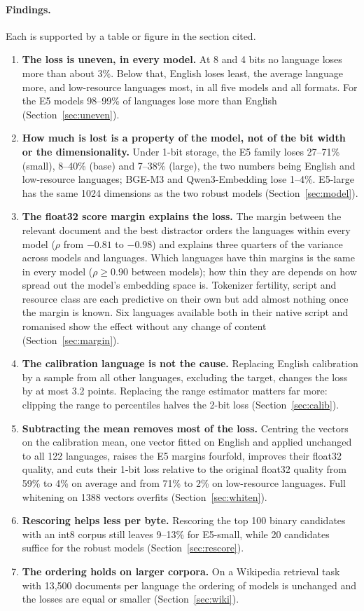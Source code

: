 \documentclass[10pt]{article}
\begin{document}
\paragraph{Findings.} Each is supported by a table or figure in the section cited.
\begin{enumerate}[nosep]
\item \textbf{The loss is uneven, in every model.} At 8 and 4 bits no language loses more than about 3\%. Below that, English loses least, the average language more, and low-resource languages most, in all five models and all formats. For the E5 models 98--99\% of languages lose more than English (Section~\ref{sec:uneven}).
\item \textbf{How much is lost is a property of the model, not of the bit width or the dimensionality.} Under 1-bit storage, the E5 family loses 27--71\% (small), 8--40\% (base) and 7--38\% (large), the two numbers being English and low-resource languages; BGE-M3 and Qwen3-Embedding lose 1--4\%. E5-large has the same 1024 dimensions as the two robust models (Section~\ref{sec:model}).
\item \textbf{The float32 score margin explains the loss.} The margin between the relevant document and the best distractor orders the languages within every model ($\rho$ from $-0.81$ to $-0.98$) and explains three quarters of the variance across models and languages. Which languages have thin margins is the same in every model ($\rho\ge0.90$ between models); how thin they are depends on how spread out the model's embedding space is. Tokenizer fertility, script and resource class are each predictive on their own but add almost nothing once the margin is known. Six languages available both in their native script and romanised show the effect without any change of content (Section~\ref{sec:margin}).
\item \textbf{The calibration language is not the cause.} Replacing English calibration by a sample from all other languages, excluding the target, changes the loss by at most 3.2 points. Replacing the range estimator matters far more: clipping the range to percentiles halves the 2-bit loss (Section~\ref{sec:calib}).
\item \textbf{Subtracting the mean removes most of the loss.} Centring the vectors on the calibration mean, one vector fitted on English and applied unchanged to all 122 languages, raises the E5 margins fourfold, improves their float32 quality, and cuts their 1-bit loss relative to the original float32 quality from 59\% to 4\% on average and from 71\% to 2\% on low-resource languages. Full whitening on 1388 vectors overfits (Section~\ref{sec:whiten}).
\item \textbf{Rescoring helps less per byte.} Rescoring the top 100 binary candidates with an int8 corpus still leaves 9--13\% for E5-small, while 20 candidates suffice for the robust models (Section~\ref{sec:rescore}).
\item \textbf{The ordering holds on larger corpora.} On a Wikipedia retrieval task with 13{,}500 documents per language the ordering of models is unchanged and the losses are equal or smaller (Section~\ref{sec:wiki}).
\end{enumerate}
\end{document}
